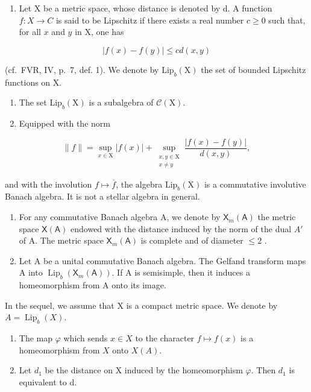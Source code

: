 \begin{enumerate}
\def\labelenumi{\arabic{enumi})}
\setcounter{enumi}{10}
\tightlist
\item
  Let X be a metric space, whose distance is denoted by d. A function \(f: X \to C\) is said to be Lipschitz if there exists a real number \(c \geqslant 0\) such that, for all \(x\) and \(y\) in X, one has
\end{enumerate}

\[
| f (x) - f (y) | \leqslant c d (x, y)
\]

(cf.~FVR, IV, p.~7, def. 1). We denote by \(\mathrm{Lip}_b(\mathrm{X})\) the set of bounded Lipschitz functions on X.

\begin{enumerate}
\def\labelenumi{\alph{enumi})}
\item
  The set \(\mathrm{Lip}_b(\mathrm{X})\) is a subalgebra of \(\mathcal{C}(\mathrm{X})\).
\item
  Equipped with the norm
\end{enumerate}

\[
\| f\| = \sup_{x\in \mathrm{X}}|f(x)| + \sup_{\substack{x,y\in \mathrm{X}\\ x\neq y}}\frac{|f(x) - f(y)|}{d(x,y)},
\]

and with the involution \(f \mapsto \overline{f}\), the algebra \(\mathrm{Lip}_b(\mathrm{X})\) is a commutative involutive Banach algebra. It is not a stellar algebra in general.

\begin{enumerate}
\def\labelenumi{\alph{enumi})}
\setcounter{enumi}{2}
\item
  For any commutative Banach algebra A, we denote by \(\mathsf{X}_{m}(\mathsf{A})\) the metric space \(\mathsf{X}(\mathsf{A})\) endowed with the distance induced by the norm of the dual \(A'\) of A. The metric space \(\mathsf{X}_{m}(\mathsf{A})\) is complete and of diameter \(\leqslant 2\) .
\item
  Let A be a unital commutative Banach algebra. The Gelfand transform maps A into \(\operatorname{Lip}_{b}(\mathsf{X}_{m}(\mathsf{A}))\). If A is semisimple, then it induces a homeomorphism from A onto its image.
\end{enumerate}

In the sequel, we assume that X is a compact metric space. We denote by \(A = \operatorname{Lip}_{b}(X)\).

\begin{enumerate}
\def\labelenumi{\alph{enumi})}
\setcounter{enumi}{4}
\item
  The map \(\varphi\) which sends \(x \in X\) to the character \(f \mapsto f(x)\) is a homeomorphism from \(X\) onto \(X(A)\).
\item
  Let \(d_{1}\) be the distance on X induced by the homeomorphism \(\varphi\). Then \(d_{1}\) is equivalent to d.
\end{enumerate}


